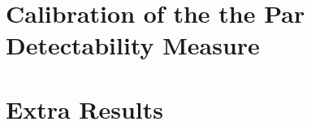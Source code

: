 \documentclass[10pt,twoside,openright,titlepage]{ce}
\begin{document}



\appendix
\chapter{Calibration of the the Par Detectability Measure}
\label{ch:perceptual:implementation:calibration}

\newpage
\chapter{Extra Results}

\newpage
\end{document}
